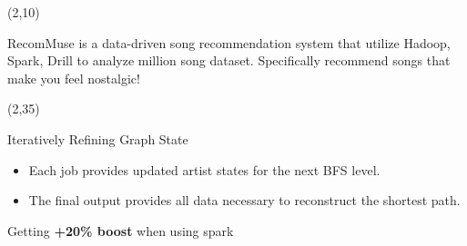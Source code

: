 \documentclass{beamer}
\begin{document}
\begin{frame}



\begin{textblock}{28.5}(2,10)
	\begin{basebox}[
        decadebox,
        title=Introduction,
        halign title=right
    ]
		RecomMuse is a data-driven song recommendation system that utilize Hadoop, Spark, Drill to analyze million song dataset. Specifically recommend songs that make you feel nostalgic!
	\end{basebox}
\end{textblock}


\begin{textblock}{28.5}(2,35)
	\begin{basebox}[
        decadebox,
        title=MapReduce vs Spark,
        halign title=right
    ]
    Iteratively Refining Graph State

		\begin{itemize}
		    \item Each job provides updated artist states for the next BFS level.
                \item The final output provides all data necessary to reconstruct the shortest path.
		\end{itemize}
        Getting \textbf{+20\% boost} when using spark
	\end{basebox}
\end{textblock}


\end{frame}
\end{document}
